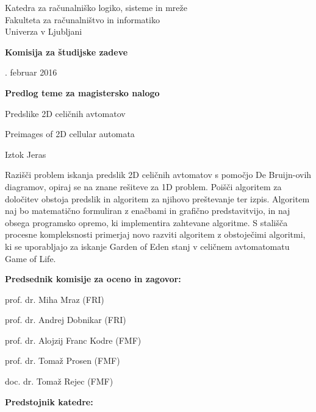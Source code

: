 \documentclass[a4paper, 12pt]{article}
\begin{document}
\noindent
Katedra za računalniško logiko, sisteme in mreže \\
Fakulteta za računalništvo in informatiko \\
Univerza v Ljubljani

\bigskip
{\bf Komisija za študijske zadeve}

. februar 2016

\bigskip
\begin{center}
{\Large\bf Predlog teme za magistersko nalogo}
\end{center}

\begin{description}[align=left,labelwidth=3cm,noitemsep,nolistsep]
\item [Naslov:]   Predslike 2D celičnih avtomatov
\item [Title:]    Preimages of 2D cellular automata
\\
\item [Kandidat:] Iztok Jeras
\\
\item [Tema naloge:] Razišči problem iskanja predslik 2D celičnih avtomatov
s pomočjo De Bruijn-ovih diagramov, opiraj se na znane rešiteve za 1D problem.
Poišči algoritem za določitev obstoja predslik in algoritem za njihovo preštevanje ter izpis.
Algoritem naj bo matematično formuliran z enačbami in grafično predstavitvijo,
in naj obsega programsko opremo, ki implementira zahtevane algoritme.
S stališča procesne kompleksnosti primerjaj novo razviti algoritem z obstoječimi algoritmi,
ki se uporabljajo za iskanje Garden of Eden stanj v celičnem avtomatomatu Game of Life.
\end{description}

{\bf Predsednik komisije za oceno in zagovor:}
\begin{description}[align=left,labelwidth=4cm,noitemsep,nolistsep]
\item [Predsednik:] prof. dr. Miha Mraz (FRI)

\item [Člani:] prof. dr. Andrej Dobnikar (FRI)

\item [Predlagani člani:] prof. dr. Alojzij Franc Kodre (FMF)
\item []                  prof. dr. Tomaž Prosen (FMF)
\item []                  doc. dr. Tomaž Rejec (FMF)
\end{description}

\bigskip
{\bf Predstojnik katedre:}
\end{document}
